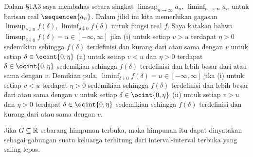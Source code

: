 
 Dalam \S1A3 saya
membahas secara singkat $\limsup_{n\to\infty}a_n$,
$\liminf_{n\to\infty}a_n$ untuk barisan real $\sequencen{a_n}$. Dalam
jilid ini kita memerlukan gagasan $\limsup_{\delta\downarrow 0}f(\delta)$,
$\liminf_{\delta\downarrow 0}f(\delta)$ untuk fungsi real $f$. Saya katakan
bahwa $\limsup_{\delta\downarrow 0}f(\delta)=u\in[-\infty,\infty]$ jika
(i) untuk setiap $v>u$ terdapat $\eta>0$ sedemikian sehingga $f(\delta)$
terdefinisi dan kurang dari atau sama dengan $v$ untuk setiap
$\delta\in\ocint{0,\eta}$ (ii) untuk setiap $v<u$ dan $\eta>0$ terdapat
$\delta\in\ocint{0,\eta}$ sedemikian sehingga $f(\delta)$ terdefinisi dan
lebih besar dari atau sama dengan $v$. Demikian pula,
$\liminf_{\delta\downarrow 0}f(\delta)=u\in[-\infty,\infty]$ jika (i) untuk
setiap $v<u$ terdapat $\eta>0$ sedemikian sehingga $f(\delta)$ terdefinisi
dan lebih besar dari atau sama dengan $v$ untuk setiap
$\delta\in\ocint{0,\eta}$ (ii) untuk setiap $v>u$ dan $\eta>0$ terdapat
$\delta\in\ocint{0,\eta}$ sedemikian sehingga $f(\delta)$ terdefinisi dan
kurang dari atau sama dengan $v$.

 Jika $G\subseteq\Bbb R$ sebarang himpunan terbuka,
maka himpunan itu dapat dinyatakan sebagai gabungan suatu keluarga terhitung dari
interval-interval terbuka yang saling lepas.

